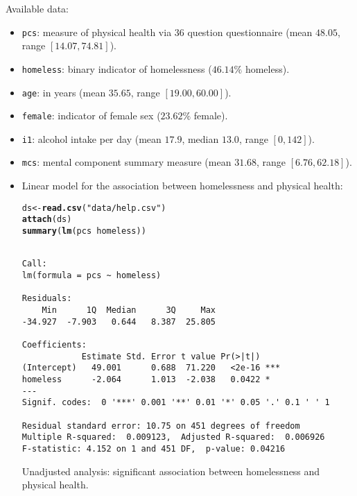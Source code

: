 \documentclass[oneside]{book}\usepackage[]{graphicx}\usepackage[svgnames]{xcolor}
\makeatletter
\newcommand{\hlstr}[1]{\textcolor[rgb]{0.192,0.494,0.8}{#1}}%
\newcommand{\hlopt}[1]{\textcolor[rgb]{0,0,0}{#1}}%
\newcommand{\hlstd}[1]{\textcolor[rgb]{0.345,0.345,0.345}{#1}}%
\newcommand{\hlkwb}[1]{\textcolor[rgb]{0.69,0.353,0.396}{#1}}%
\newcommand{\hlkwd}[1]{\textcolor[rgb]{0.737,0.353,0.396}{\textbf{#1}}}%
\newenvironment{kframe}{%
 \def\at@end@of@kframe{}%
 \ifinner\ifhmode%
  \def\at@end@of@kframe{\end{minipage}}%
  \begin{minipage}{\columnwidth}%
 \fi\fi%
 \def\FrameCommand##1{\hskip\@totalleftmargin \hskip-\fboxsep
 \colorbox{shadecolor}{##1}\hskip-\fboxsep
     \hskip-\linewidth \hskip-\@totalleftmargin \hskip\columnwidth}%
 \MakeFramed {\advance\hsize-\width
   \@totalleftmargin\z@ \linewidth\hsize
   \@setminipage}}%
 {\par\unskip\endMakeFramed%
 \at@end@of@kframe}
\newenvironment{knitrout}{}{} %
\makeatother
\begin{document}
Available data:
\begin{itemize}
      \item \texttt{pcs}: measure of physical health via 36 question questionnaire
            (mean $48.05$, range $[14.07, 74.81]$).
      \item \texttt{homeless}: binary indicator of homelessness ($46.14\%$ homeless).
      \item \texttt{age}: in years (mean $35.65$, range $[19.00, 60.00]$).
      \item \texttt{female}: indicator of female sex ($23.62\%$ female).
      \item \texttt{i1}: alcohol intake per day (mean $17.9$, median $13.0$, range $[0,142]$).
      \item \texttt{mcs}: mental component summary measure
            (mean $31.68$, range $[6.76, 62.18]$).
\end{itemize}
\begin{itemize}
      \item Linear model for the association between homelessness and
            physical health:
\begin{knitrout}
\color{fgcolor}\begin{kframe}
\begin{alltt}
\hlstd{ds} \hlkwb{<-} \hlkwd{read.csv}\hlstd{(}\hlstr{"data/help.csv"}\hlstd{)}
\hlkwd{attach}\hlstd{(ds)}
\hlkwd{summary}\hlstd{(}\hlkwd{lm}\hlstd{(pcs} \hlopt{~} \hlstd{homeless))}
\end{alltt}
\begin{verbatim}

Call:
lm(formula = pcs ~ homeless)

Residuals:
    Min      1Q  Median      3Q     Max 
-34.927  -7.903   0.644   8.387  25.805 

Coefficients:
            Estimate Std. Error t value Pr(>|t|)    
(Intercept)   49.001      0.688  71.220   <2e-16 ***
homeless      -2.064      1.013  -2.038   0.0422 *  
---
Signif. codes:  0 '***' 0.001 '**' 0.01 '*' 0.05 '.' 0.1 ' ' 1

Residual standard error: 10.75 on 451 degrees of freedom
Multiple R-squared:  0.009123,	Adjusted R-squared:  0.006926 
F-statistic: 4.152 on 1 and 451 DF,  p-value: 0.04216
\end{verbatim}
\end{kframe}
\end{knitrout}
            Unadjusted analysis: significant association between homelessness
            and physical health.
\end{itemize}
\end{document}
